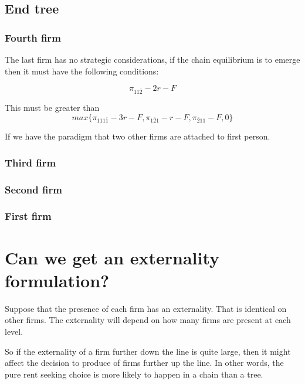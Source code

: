\documentclass{article}
\begin{document}
\subsection{End tree}

\subsubsection{Fourth firm}

The last firm has no strategic considerations, if the chain equilibrium is to emerge then it must have the following conditions: 

\begin{equation*}
\pi_{11\overline{2}}-2r-F
\end{equation*}

This must be greater than 
\begin{equation*}
max\{\pi_{111\overline{1}}-3r-F,\pi_{1\overline{2}1}-r-F,\pi_{\overline{2}11}-F,0\}    
\end{equation*}

If we have the paradigm that two other firms are attached to first person. 

\subsubsection{Third firm}

\subsubsection{Second firm}

\subsubsection{First firm}

\section{Can we get an externality formulation? }

Suppose that the presence of each firm has an externality. That is identical on other firms. The externality will depend on how many firms are present at each level. 

So if the externality of a firm further down the line is quite large, then it might affect the decision to produce of firms further up the line. In other words, the pure rent seeking choice is more likely to happen in a chain than a tree.  
\end{document}
